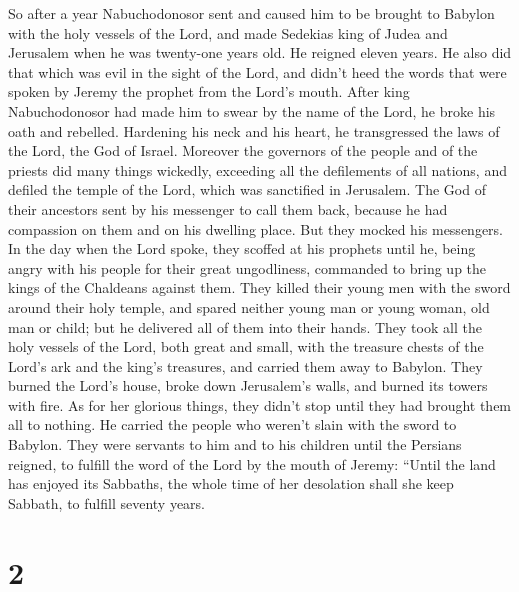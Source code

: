  So after a year Nabuchodonosor sent and caused him to be
brought to Babylon with the holy vessels of the Lord,  and
made Sedekias king of Judea and Jerusalem when he was twenty-one years
old. He reigned eleven years.  He also did that which was
evil in the sight of the Lord, and didn't heed the words that were
spoken by Jeremy the prophet from the Lord's mouth.  After
king Nabuchodonosor had made him to swear by the name of the Lord, he
broke his oath and rebelled. Hardening his neck and his heart, he
transgressed the laws of the Lord, the God of Israel. 
Moreover the governors of the people and of the priests did many things
wickedly, exceeding all the defilements of all nations, and defiled the
temple of the Lord, which was sanctified in Jerusalem.  The
God of their ancestors sent by his messenger to call them back, because
he had compassion on them and on his dwelling place.  But
they mocked his messengers. In the day when the Lord spoke, they scoffed
at his prophets  until he, being angry with his people for
their great ungodliness, commanded to bring up the kings of the
Chaldeans against them.  They killed their young men with
the sword around their holy temple, and spared neither young man or
young woman, old man or child; but he delivered all of them into their
hands.  They took all the holy vessels of the Lord, both
great and small, with the treasure chests of the Lord's ark and the
king's treasures, and carried them away to Babylon.  They
burned the Lord's house, broke down Jerusalem's walls, and burned its
towers with fire.  As for her glorious things, they didn't
stop until they had brought them all to nothing. He carried the people
who weren't slain with the sword to Babylon.  They were
servants to him and to his children until the Persians reigned, to
fulfill the word of the Lord by the mouth of Jeremy: 
``Until the land has enjoyed its Sabbaths, the whole time of her
desolation shall she keep Sabbath, to fulfill seventy years.

\hypertarget{section-1}{%
\section{2}\label{section-1}}


